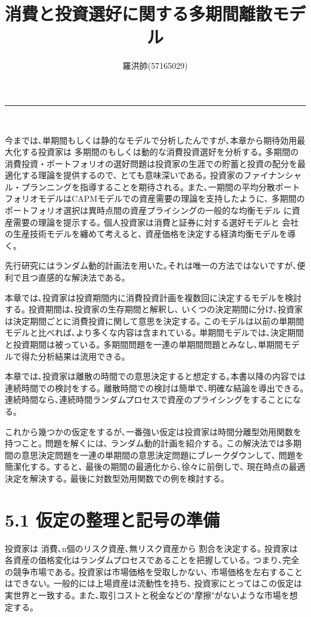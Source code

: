 \documentclass[uplatex,a4paper]{jsarticle}
\title{消費と投資選好に関する多期間離散モデル}
\author{羅洪帥(57165029)}
\date{}
\begin{document}
\maketitle
\hrule
\medskip　　%

今までは､単期間もしくは静的なモデルで分析したんですが､本章から期待効用最大化する投資家は
多期間のもしくは動的な消費投資選好を分析する｡
多期間の消費投資・ポートフォリオの選好問題は投資家の生涯での貯蓄と投資の配分を最適化する理論を提供するので､
とても意味深いである｡
投資家のファイナンシャル・プランニングを指導することを期待される｡
また､一期間の平均分散ポートフォリオモデルはCAPMモデルでの資産需要の理論を支持したように､
多期間のポートフォリオ選択は異時点間の資産プライシングの一般的な均衡モデル
に資産需要の理論を提示する｡
個人投資家は消費と証券に対する選好モデルと
会社の生産技術モデルを纏めて考えると､
資産価格を決定する経済均衡モデルを導く｡

先行研究にはランダム動的計画法を用いた｡それは唯一の方法ではないですが､便利で且つ直感的な解決法である｡

本章では､投資家は投資期間内に消費投資計画を複数回に決定するモデルを検討する｡
投資期間は､投資家の生存期間と解釈し､ いくつの決定期間に分け､投資家は決定期間ごとに消費投資に関して意思を決定する｡
このモデルは以前の単期間モデルと比べれば､より多くな内容は含まれている｡
単期間モデルでは､決定期間と投資期間は被っている｡
多期間問題を一連の単期間問題とみなし､単期間モデルで得た分析結果は流用できる｡

本章では､投資家は離散の時間での意思決定すると想定する｡本書以降の内容では連続時間での検討をする｡
離散時間での検討は簡単で､明確な結論を導出できる｡
連続時間なら､連続時間ランダムプロセスで資産のプライシングをすることになる｡

これから幾つかの仮定をするが､一番強い仮定は投資家は時間分離型効用関数を持つこと｡
問題を解くには､ ランダム動的計画を紹介する｡
この解決法では多期間の意思決定問題を一連の単期間の意思決定問題にブレークダウンして､
問題を簡潔化する｡
すると､ 最後の期間の最適化から､徐々に前倒しで､ 現在時点の最適決定を解決する｡
最後に対数型効用関数での例を検討する｡


\section*{5.1 仮定の整理と記号の準備}
投資家は 消費､n個のリスク資産､無リスク資産から 割合を決定する｡
投資家は各資産の価格変化はランダムプロセスであることを把握している｡
つまり､完全の競争市場である｡
投資家は市場価格を受取しかない､ 市場価格を左右することはできない｡
一般的には上場資産は流動性を持ち､ 投資家にとってはこの仮定は実世界と一致する｡
また､取引コストと税金などの"摩擦"がないような市場を想定する｡
\end{document}
